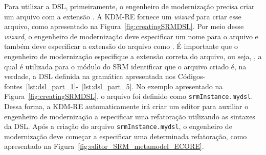 


Para utilizar a DSL, primeiramente, o engenheiro de modernização precisa criar um arquivo com a extensão . A KDM-RE fornece um \textit{wizard} para criar esse arquivo, como apresentado na Figura~\ref{fig:creatingSRMDSL}. Por meio desse \textit{wizard}, o engenheiro de modernização deve especificar um nome para o arquivo e também deve especificar a extensão do arquivo como . É importante que o engenheiro de modernização especifique a extensão correta do arquivo, ou seja, , a qual é utilizada para o módulo do SRM identificar que o arquivo criado é, na verdade, a DSL definida na gramática apresentada nos Códigos-fontes~\ref{lst:dsl_part_1}-~\ref{lst:dsl_part_5}. No exemplo apresentado na Figura~\ref{fig:creatingSRMDSL}, o arquivo foi definido como \texttt{srmInstance.mydsl}. Dessa forma, a KDM-RE automaticamente irá criar um editor para auxiliar o engenheiro de modernização a especificar uma refatoração utilizando as sintaxes da DSL. Após a criação do arquivo \texttt{srmInstance.mydsl}, o engenheiro de modernização deve começar a especificar uma determinada refatoração, como apresentado na Figura~\ref{fig:editor_SRM_metamodel_ECORE}. 


